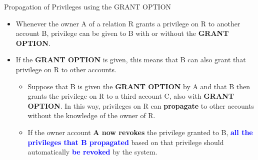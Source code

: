 \begin{frame}{Propagation of Privileges using the GRANT OPTION}
    \Large %
    
    \begin{itemize}
        \vspace{-0.5cm} %
        
        \item Whenever the owner A of a relation R grants a privilege on R to another account B, privilege can be given to B with or without the \textbf{GRANT OPTION}.
        
        \vspace{0.2cm} %
        
        \item If the \textbf{GRANT OPTION} is given, this means that B can also grant that privilege on R to other accounts.
        
        \begin{itemize}
            \normalsize %
            \setlength{\itemsep}{0.2cm} %
            
            \item Suppose that B is given the \textbf{GRANT OPTION} by A and that B then grants the privilege on R to a third account C, also with \textbf{GRANT OPTION}. In this way, privileges on R can \textbf{propagate} to other accounts without the knowledge of the owner of R.
            
            \item If the owner account \textbf{A now revokes} the privilege granted to B, \textbf{\textcolor{blue}{all the privileges that B propagated}} based on that privilege should automatically \textbf{\textcolor{blue}{be revoked}} by the system.
        \end{itemize}
        
    \end{itemize}
\end{frame}


